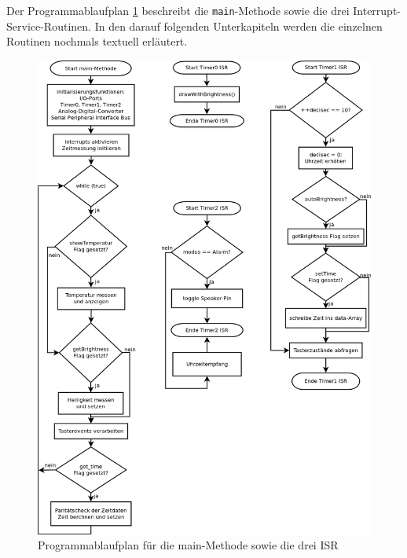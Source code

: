 Der Programmablaufplan \ref{fig_pap} beschreibt die \texttt{main}-Methode sowie die drei Interrupt-Service-Routinen. In den darauf folgenden Unterkapiteln werden die einzelnen Routinen nochmals textuell erläutert.
\begin{figure}[htp]
\includegraphics[width=\textwidth]{../doc/images/papTimerAndMain.png}
\caption{Programmablaufplan für die main-Methode sowie die drei ISR}\label{fig_pap}
\end{figure}
%
